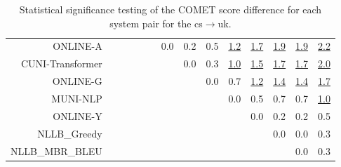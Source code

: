 \documentclass[11pt]{article}
\begin{document}
\begin{sidewaystable}
\begin{center}
{\begin{tabular}{rccccccccccccc}
ONLINE-A &  &  &  &  &  & \cellcolor{red!0} 0.0 & \cellcolor{red!0} 0.2 & \cellcolor{red!70} 0.5 & \cellcolor{red!70} \underline{1.2} & \cellcolor{red!70} \underline{1.7} & \cellcolor{red!70} \underline{1.9} & \cellcolor{red!70} \underline{1.9} & \cellcolor{red!70} \underline{2.2}\\ 
CUNI-Transformer &  &  &  &  &  &  & \cellcolor{red!0} 0.0 & \cellcolor{red!10} 0.3 & \cellcolor{red!70} \underline{1.0} & \cellcolor{red!70} \underline{1.5} & \cellcolor{red!70} \underline{1.7} & \cellcolor{red!70} \underline{1.7} & \cellcolor{red!70} \underline{2.0}\\ 
ONLINE-G &  &  &  &  &  &  &  & \cellcolor{red!0} 0.0 & \cellcolor{red!70} 0.7 & \cellcolor{red!70} \underline{1.2} & \cellcolor{red!70} \underline{1.4} & \cellcolor{red!70} \underline{1.4} & \cellcolor{red!70} \underline{1.7}\\ 
MUNI-NLP &  &  &  &  &  &  &  &  & \cellcolor{red!0} 0.0 & \cellcolor{red!40} 0.5 & \cellcolor{red!60} 0.7 & \cellcolor{red!70} 0.7 & \cellcolor{red!70} \underline{1.0}\\ 
ONLINE-Y &  &  &  &  &  &  &  &  &  & \cellcolor{red!0} 0.0 & \cellcolor{red!0} 0.2 & \cellcolor{red!0} 0.2 & \cellcolor{red!50} 0.5\\ 
NLLB\_Greedy &  &  &  &  &  &  &  &  &  &  & \cellcolor{red!0} 0.0 & \cellcolor{red!0} 0.0 & \cellcolor{red!0} 0.3\\ 
NLLB\_MBR\_BLEU &  &  &  &  &  &  &  &  &  &  &  & \cellcolor{red!0} 0.0 & \cellcolor{red!0} 0.3\\ 
\bottomrule 
\end{tabular} }
\caption{Statistical significance testing of the COMET score difference for each system pair for the cs$\rightarrow$uk.} 
 \end{center} \end{sidewaystable} 
\end{document}
